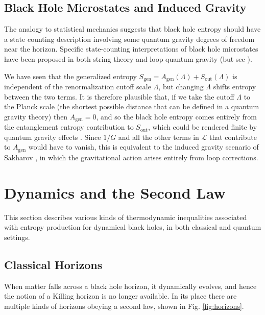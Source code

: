 \documentclass[12pt]{article}
\begin{document}
\subsection{Black Hole Microstates and Induced Gravity}\label{sec:induced}

The analogy to statistical mechanics suggests that black hole entropy should have a state counting description involving some quantum gravity degrees of freedom near the horizon.  Specific state-counting interpretations of black hole microstates have been proposed in both string theory \cite{Strominger:1996sh,Breckenridge:1996sn,Horowitz:1996nw,Sen:2007qy} and loop quantum gravity \cite{Ashtekar:1997yu,Meissner:2004ju,Bianchi:2012ui} (but see \cite{Jacobson:2007uj}).

We have seen that the generalized entropy $S_\mathrm{gen} = A_\mathrm{gen}(\Lambda) + S_\mathrm{out}(\Lambda)$ is independent of the renormalization cutoff scale $\Lambda$, but changing $\Lambda$ shifts entropy between the two terms.  It is therefore plausible that, if we take the cutoff $\Lambda$ to the Planck scale (the shortest possible distance that can be defined in a quantum gravity theory) then $A_\mathrm{gen} = 0$, and so the black hole entropy comes entirely from the entanglement entropy contribution to $S_\mathrm{out}$, which could be rendered finite by quantum gravity effects \cite{Sorkin:2014kta}.  Since $1/G$ and all the other terms in $\mathcal{L}$ that contribute to $A_\mathrm{gen}$ would have to vanish, this is equivalent \cite{susskind1994black,jacobson1994black,Frolov:1996aj} to the induced gravity scenario of Sakharov \cite{sakharov1968vacuum}, in which the gravitational action arises entirely from loop corrections.

\section{Dynamics and the Second Law}\label{sec:2nd}

This section describes various kinds of thermodynamic inequalities associated with entropy production for dynamical black holes, in both classical and quantum settings.

\subsection{Classical Horizons}

When matter falls across a black hole horizon, it dynamically evolves, and hence the notion of a Killing horizon is no longer available.  In its place there are multiple kinds of horizons obeying a second law, shown in Fig. \ref{fig:horizons}.
\end{document}

